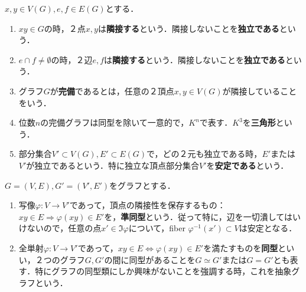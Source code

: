 \documentclass[uplatex,dvipdfmx]{jsreport}
\begin{document}
\begin{definition}
    $x,y\in V(G), e,f\in E(G)$とする．
    \begin{enumerate}
        \item $xy\in G$の時，２点$x,y$は\textbf{隣接する}という．隣接しないことを\textbf{独立である}という．
        \item $e\cap f\ne\emptyset$の時，２辺$e,f$は\textbf{隣接する}という．隣接しないことを\textbf{独立である}という．
        \item グラフ$G$が\textbf{完備}であるとは，任意の２頂点$x,y\in V(G)$が隣接していることをいう．
        \item 位数$n$の完備グラフは同型を除いて一意的で，$K^n$で表す．$K^3$を\textbf{三角形}という．
        \item 部分集合$V'\subset V(G),E'\subset E(G)$で，どの２元も独立である時，$E'$または$V'$が独立であるという．特に独立な頂点部分集合$V'$を\textbf{安定である}という．
    \end{enumerate}
\end{definition}

\begin{definition}
    $G=(V,E),G'=(V',E')$をグラフとする．
    \begin{enumerate}
        \item 写像$\varphi:V\to V'$であって，頂点の隣接性を保存するもの：$xy\in E\Rightarrow \varphi(xy)\in E'$を，\textbf{準同型}という．従って特に，辺を一切潰してはいけないので，任意の点$x'\in\Im\varphi$について，fiber $\varphi^{-1}(x')\subset V$は安定となる．
        \item 全単射$\varphi:V\to V'$であって，$xy\in E\Leftrightarrow \varphi(xy)\in E'$を満たすものを\textbf{同型}といい，２つのグラフ$G,G'$の間に同型があることを$G\simeq G'$または$G=G'$とも表す．特にグラフの同型類にしか興味がないことを強調する時，これを抽象グラフという．
    \end{enumerate}
\end{definition}
\end{document}
